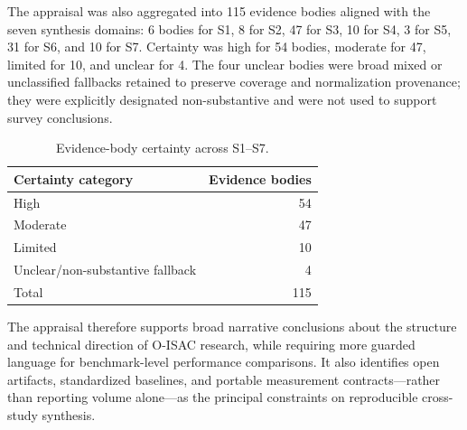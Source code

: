 The appraisal was also aggregated into 115 evidence bodies aligned with the
seven synthesis domains: 6 bodies for S1, 8 for S2, 47 for S3, 10 for S4, 3
for S5, 31 for S6, and 10 for S7. Certainty was high for 54 bodies, moderate
for 47, limited for 10, and unclear for 4. The four unclear bodies were broad
mixed or unclassified fallbacks retained to preserve coverage and
normalization provenance; they were explicitly designated non-substantive and
were not used to support survey conclusions.

\begin{table}[!t]
\caption{Evidence-body certainty across S1--S7.}
\label{tab:evidence_body_certainty}
\centering
\begin{tabular}{lr}
\toprule
\textbf{Certainty category} & \textbf{Evidence bodies} \\
\midrule
High & 54 \\
Moderate & 47 \\
Limited & 10 \\
Unclear/non-substantive fallback & 4 \\
\midrule
Total & 115 \\
\bottomrule
\end{tabular}
\end{table}

The appraisal therefore supports broad narrative conclusions about the
structure and technical direction of O-ISAC research, while requiring more
guarded language for benchmark-level performance comparisons. It also
identifies open artifacts, standardized baselines, and portable measurement
contracts---rather than reporting volume alone---as the principal constraints
on reproducible cross-study synthesis.
